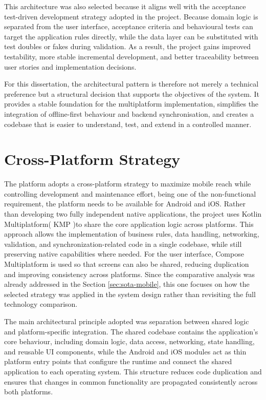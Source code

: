 This architecture was also selected because it aligns well with the acceptance test-driven development strategy adopted in the project. Because domain logic is separated from the user interface, acceptance criteria and behavioural tests can target the application rules directly, while the data layer can be substituted with test doubles or fakes during validation. As a result, the project gains improved testability, more stable incremental development, and better traceability between user stories and implementation decisions.

For this dissertation, the architectural pattern is therefore not merely a technical preference but a structural decision that supports the objectives of the system. It provides a stable foundation for the multiplatform implementation, simplifies the integration of offline-first behaviour and backend synchronisation, and creates a codebase that is easier to understand, test, and extend in a controlled manner.


\section{Cross-Platform Strategy}
\label{sec:arch-crossplatform}

The platform adopts a cross-platform strategy to maximize mobile reach while controlling development and maintenance effort, being one of the non-functional requirement, the platform needs to be available for Android and iOS.
Rather than developing two fully independent native applications, the project uses Kotlin Multiplatform( KMP )to share the core application logic across platforms. This approach allows the implementation of business rules, data handling, networking, validation, and synchronization-related code in a single codebase, while still preserving native capabilities where needed. For the user interface, Compose Multiplatform is used so that screens can also be shared, reducing duplication and improving consistency across platforms. Since the comparative analysis was already addressed in the Section \ref{sec:sota-mobile}, this one focuses on how the selected strategy was applied in the system design rather than revisiting the full technology comparison.

The main architectural principle adopted was separation between shared logic and platform-specific integration. The shared codebase contains the application’s core behaviour, including domain logic, data access, networking, state handling, and reusable UI components, while the Android and iOS modules act as thin platform entry points that configure the runtime and connect the shared application to each operating system. This structure reduces code duplication and ensures that changes in common functionality are propagated consistently across both platforms.

